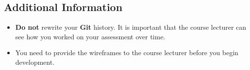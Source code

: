 \documentclass{article}
\begin{document}
\subsection*{Additional Information}
\begin{itemize}
	\item \textbf{Do not} rewrite your \textbf{Git} history. It is important that the course lecturer can see how you worked on your assessment over time.
	\item You need to provide the wireframes to the course lecturer before you begin development.
\end{itemize}
\end{document}
